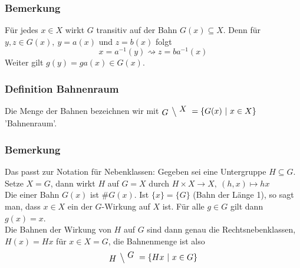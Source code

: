 \subsubsection*{Bemerkung}
Für jedes $x\in X$ wirkt $G$ transitiv auf der Bahn $G(x)\subseteq X$.
Denn für $y,z\in G(x),~y=a(x)$ und $z=b(x)$ folgt
\[
x=a^{-1}(y) \rightsquigarrow z=ba^{-1}(x)
\]
Weiter gilt $g(y)=ga(x)\in G(x)$.

\subsubsection*{Definition Bahnenraum}
Die Menge der Bahnen bezeichnen wir mit $\xfrac{G}{X}=\{G(x)~|~x\in X \}$ 'Bahnenraum'.

\subsubsection*{Bemerkung}
Das passt zur Notation für Nebenklassen: 
Gegeben sei eine Untergruppe $H\subseteq G$. 
Setze $X=G$, dann wirkt $H$ auf $G=X$ durch $H\times X\to X,~(h,x)\mapsto hx$\\
Die  einer Bahn $G(x)$ ist $\#G(x)$. 
Ist $\{x\}=\{G\}$ (Bahn der Länge 1), so sagt man, dass $x\in X$ ein  der $G$-Wirkung auf $X$ ist. 
Für alle $g\in G$ gilt dann $g(x)=x$.\\
Die Bahnen der Wirkung von $H$ auf $G$ sind dann genau die Rechtsnebenklassen, $H(x)=Hx$ für $x\in X=G$, die Bahnenmenge ist also 
\[
\xfrac{H}{G}=\{Hx~|~x\in G\}
\]

\newpage
